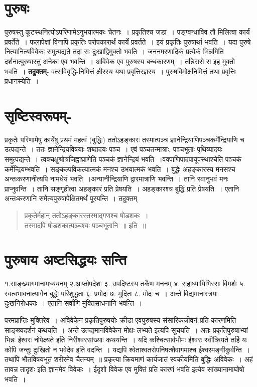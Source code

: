 {\section*{पुरुषः}

पुरुषस्तु कूटस्थनित्योऽपरिणामेऽनुभयात्मकः चेतनः~। प्रकृतिश्च जडा~। पङ्ग्वन्धाविव तौ मिलित्वा कार्यं प्रवर्तेते~। फलापेक्षां विनापि प्रकृतिः परोपकारार्थं कार्ये प्रवर्तते~। इयं प्रकृतिः पुरुषार्था भवति~। यदा पुरुषे नित्यानित्यविवेकः समुत्पद्यते तदा सः दुःखाद्विमुक्तो भवति~। जननमरणादिकं प्रत्येकं भिन्नमिति दर्शनात्पुरुषास्तु अनेका एव भवन्ति~। अविवेक एव पुरुषस्य बन्धकारणम्~। तन्निरासे स इह मुक्तो भवति~। \textbf{तदुक्तम्}- वत्सविवृद्धि-निमित्तं क्षीरस्य यथा प्रवृत्तिरज्ञस्य~। पुरुषविमोक्षनिमित्तं तथा प्रवृत्तिः प्रधानस्येति~। 

\section*{सृष्टिस्वरूपम्-} 

प्रकृतेः परिणामेषु कार्येषु प्रथमं महत्वं (बुद्धिः)  ततोऽहङ्कारः  तस्मात्पञ्च ज्ञानेन्द्रियाणि\break पञ्चकर्मेन्द्रियाणि च उत्पद्यन्ते~। ततः ज्ञानेन्द्रियविषयाः शब्दादयः पञ्च~। एवं पञ्चतन्मात्राः, पञ्चभूताः पृथिव्यादयः समुत्पद्यन्ते~। त्वक्चक्षुश्रोत्रजिह्वाघ्राणेति पञ्चकं ज्ञानेन्द्रियं भवति~।\break वक्पाणिपादपायूपस्थाश्चेति पञ्चकं कर्मेन्द्रियम्भवति~। सङ्कल्पविकल्पात्मकं मनश्च उभयात्मकं भवति~। बुद्धेः अहङ्कारस्य मनसश्च अन्तःकरणानीत्यपि नामधेयं भवति~।\break अन्यानीन्द्रियाणि द्वारमात्राणि भवन्ति~। तानि स्वानुभवं मनः प्राप्नुवन्ति~। तानि सङ्गृहीत्वा अहङ्कारं प्रति प्रेषयति~। अहङ्कारश्च बुद्धिं प्रति प्रेषयति~। एतानि अन्तःकरणानि समेत्य\break पुरुषापेक्षितमर्थं पूरयन्ति~। तदुक्तम् 
\begin{verse}
प्रकृतेर्महान् ततोऽहङ्कारस्तस्माद्गणश्च षोडशकः~। \\
तस्मादपि षोडशकात्पञ्चश्यः पञ्चभूतानि~॥ इति~॥
\end{verse}

\section*{पुरुषाय अष्टसिद्धयः सन्ति}

१.साङ्ख्यागमानामध्ययनम् 	२.आप्तोपदेशः ३.  उपदिष्टस्य तर्केण मननम्
४. सहाध्यायिभिस्सः विमर्शः 	५. स्वत्वभावनात्यागेन बुद्धेः परिशुद्धता	६. प्रमोदः
७. मुदितः	८. मोदः च~। अन्ते विद्यमानास्त्रयः दुःखनिरोधकाः~। एतानि सर्वाणि मुक्तिसाधनानि भवन्ति~। 

परमप्राप्तिः मुक्तिरेव~। अविवेकेन प्रकृतिपुरुषयोः क्रीडा एवपुरुषस्य संसारिकजीवनं प्रति कारणमिति साङ्ख्यदर्शनं कथयति~। अन्ते उत्प्द्यमानविवेकेन मोक्षः लभ्यते इत्यपि सूचयति~। अतः प्रकृतिपुरुषाभ्यां भिन्नः ईश्वरः नोपेक्ष्यते इति निरीश्वरसांख्याः कथयन्ति~। यदि कश्चित्सार्वभौमः ईश्वरः स्वीक्रियते तर्हि यः कोपि जन्तुः दुःखितो न भवेदेव इति वदन्ति~। यद्यपि श्वेताश्वतरोपनिषत्शैवागमाश्च ईश्वरमङ्गीकुर्वन्ति~। तथापि भौतविषयभूतं शरीरमेव चैतन्यम्~॥ प्रकृत्या क्रियमाणं कार्यजातं स्वकीयमिति बुद्धिः अविवेकः~। अहं तावन्न तादृशः इति ज्ञानमेव विवेकः~। ईदृशो विवेक एव मुक्तिं प्रति कारणं भवति इत्येव सांख्यानामाघोषो भवति~। 

\articleend
}
